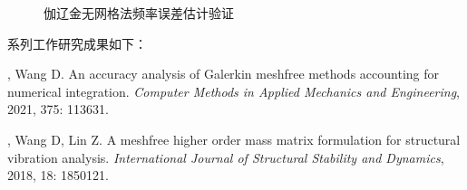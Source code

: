 \begin{figure}[!h]
    \centering 
    \caption{伽辽金无网格法频率误差估计验证}
    \label{fg:frequency}
\end{figure}


系列工作研究成果如下：

\vspace{-50pt}
\begin{thebibliography}{1}

	, Wang D.
	\newblock An accuracy analysis of {{Galerkin}} meshfree methods accounting for
	  numerical integration.
	\newblock \emph{Computer Methods in Applied Mechanics and Engineering}, 2021,
	  375: 113631.

	, Wang D, Lin Z.
	\newblock A meshfree higher order mass matrix formulation for structural
	  vibration analysis.
	\newblock \emph{International Journal of Structural Stability and Dynamics},
	  2018, 18: 1850121.

\end{thebibliography}


